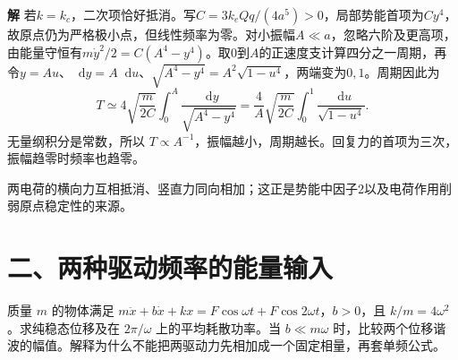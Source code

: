 \documentclass[11pt,openany,fontset=fandol]{ctexbook}
\theoremstyle{plain}\newtheorem{theorem}{定理}[chapter]\newtheorem{proposition}[theorem]{命题}
\theoremstyle{definition}\newtheorem{definition}{定义}[chapter]\newtheorem{example}{例}[chapter]
\theoremstyle{remark}\newtheorem*{remark}{说明}
\newcommand{\SolutionStart}{\par\nobreak\medskip\nobreak\noindent\textbf{解}\quad\ignorespaces}
\newenvironment{solution}{\SolutionStart}{\par\medskip}
\newcommand{\dd}{\mathop{}\!\mathrm d}\newcommand{\ii}{\mathrm i}\newcommand{\ee}{\mathrm e}
\begin{document}
\begin{solution}
若$k=k_c$，二次项恰好抵消。写$C=3k_eQq/(4a^5)>0$，局部势能首项为$Cy^4$，故原点仍为严格极小点，但线性频率为零。对小振幅$A\ll a$，忽略六阶及更高项，由能量守恒有$m\dot y^2/2=C(A^4-y^4)$。取$0$到$A$的正速度支计算四分之一周期，再令$y=Au$、$\dd y=A\dd u$、$\sqrt{A^4-y^4}=A^2\sqrt{1-u^4}$，两端变为$0,1$。周期因此为
\[
T\simeq4\sqrt{\frac m{2C}}\int_0^A\frac{\dd y}{\sqrt{A^4-y^4}}
=\frac4A\sqrt{\frac m{2C}}\int_0^1\frac{\dd u}{\sqrt{1-u^4}}.
\]
无量纲积分是常数，所以 $T\propto A^{-1}$，振幅越小，周期越长。回复力的首项为三次，振幅趋零时频率也趋零。

两电荷的横向力互相抵消、竖直力同向相加；这正是势能中因子2以及电荷作用削弱原点稳定性的来源。
\end{solution}

\noindent\begin{minipage}{\textwidth}
\vspace{12pt}
\section*{二、两种驱动频率的能量输入}
质量 $m$ 的物体满足 $m\ddot x+b\dot x+kx=F\cos\omega t+F\cos2\omega t$，$b>0$，且 $k/m=4\omega^2$。求纯稳态位移及在 $2\pi/\omega$ 上的平均耗散功率。当 $b\ll m\omega$ 时，比较两个位移谐波的幅值。解释为什么不能把两驱动力先相加成一个固定相量，再套单频公式。

\end{minipage}\par

\end{document}
